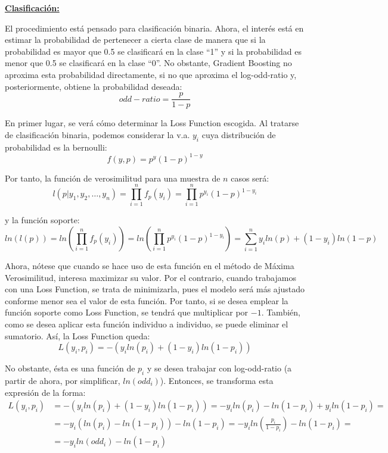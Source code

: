 \documentclass[12pt,twoside]{article}
\begin{document}
\bigskip \bigskip

\textbf{\underline{Clasificación: }}

El procedimiento está pensado para clasificación binaria. Ahora, el interés está en estimar la probabilidad de pertenecer a cierta clase de manera que si la probabilidad es mayor que 0.5 se clasificará en la clase ``1'' y si la probabilidad es menor que 0.5 se clasificará en la clase ``0''. No obstante, Gradient Boosting no aproxima esta probabilidad directamente, si no que aproxima el log-odd-ratio y, posteriormente, obtiene la probabilidad deseada:
\begin{equation*}
odd-ratio = \frac{p}{1-p}
\end{equation*}

En primer lugar, se verá cómo determinar la Loss Function escogida. Al tratarse de clasificación binaria, podemos considerar la v.a. $y_i$ cuya distribución de probabilidad es la bernoulli:
\begin{equation*}
f(y, p) = p^y(1-p)^{1-y}
\end{equation*}

Por tanto, la función de verosimilitud para una muestra de $n$ casos será:
\begin{equation*}
l(p|y_1, y_2, \dots, y_n) = \prod_{i=1}^n f_p(y_i) = \prod_{i=1}^n p^{y_i}(1-p)^{1-y_i}
\end{equation*}

\noindent
y la función soporte:
\begin{equation*}
ln(l(p)) = ln \left( \prod_{i=1}^n f_p(y_i) \right) = ln \left( \prod_{i=1}^n p^{y_i}(1-p)^{1-y_i} \right) = \sum_{i=1}^n y_i ln(p) + (1-y_i)ln(1-p)
\end{equation*}

Ahora, nótese que cuando se hace uso de esta función en el método de Máxima Verosimilitud, interesa maximizar su valor. Por el contrario, cuando trabajamos con una Loss Function, se trata de minimizarla, pues el modelo será más ajustado conforme menor sea el valor de esta función. Por tanto, si se desea emplear la función soporte como Loss Function, se tendrá que multiplicar por $-1$. También, como se desea aplicar esta función individuo a individuo, se puede eliminar el sumatorio. Así, la Loss Function queda:
\begin{equation*}
L(y_i, p_i) = -( y_i ln(p_i) + (1-y_i)ln(1-p_i))
\end{equation*}

No obstante, ésta es una función de $p_i$ y se desea trabajar con log-odd-ratio (a partir de ahora, por simplificar, $ln(odd_i)$). Entonces, se transforma esta expresión de la forma:
\begin{equation}
\label{eq:03}
\begin{split}
L(y_i, p_i) &= -(y_i ln(p_i) + (1-y_i)ln(1-p_i)) = -y_i ln(p_i) - ln(1-p_i) + y_i ln(1-p_i) = \\
& = -y_i(ln(p_i) - ln(1-p_i)) - ln(1-p_i) = -y_i ln \left( \frac{p_i}{1-p_i} \right) - ln(1-p_i) = \\
& = -y_i ln(odd_i) - ln(1-p_i)
\end{split}
\end{equation}
\end{document}
